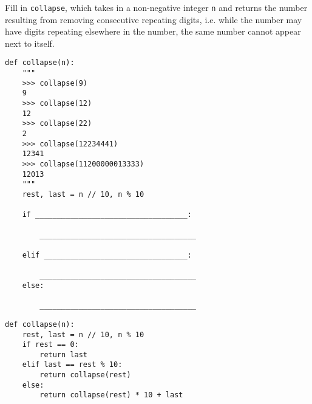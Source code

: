 \begin{blocksection}
\question
Fill in \lstinline{collapse}, which takes in a non-negative integer \lstinline{n} and returns the number resulting from removing consecutive repeating digits, i.e. while the number may have digits repeating elsewhere in the number, the same number cannot appear next to itself.

\begin{lstlisting}
def collapse(n):
    """
    >>> collapse(9)
    9
    >>> collapse(12)
    12
    >>> collapse(22)
    2
    >>> collapse(12234441)
    12341
    >>> collapse(11200000013333)
    12013
    """
    rest, last = n // 10, n % 10

    if ___________________________________:

        ____________________________________

    elif _________________________________:

        ____________________________________
    else:

        ____________________________________
\end{lstlisting}
\end{blocksection}

\begin{blocksection}
\begin{solution}
\begin{lstlisting}
def collapse(n):
    rest, last = n // 10, n % 10
    if rest == 0:
        return last
    elif last == rest % 10:
        return collapse(rest)
    else:
        return collapse(rest) * 10 + last
\end{lstlisting}
\end{solution}
\end{blocksection}

